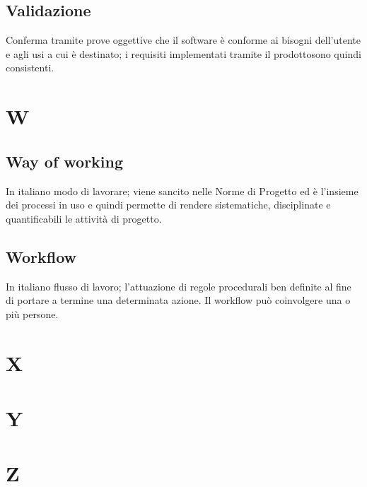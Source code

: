 \subsection*{Validazione}
Conferma tramite prove oggettive che il software è conforme ai bisogni dell'utente e agli usi a cui è destinato; i requisiti implementati tramite il prodotto\glosp sono quindi consistenti.

\clearpage
\section*{W}

\subsection*{Way of working}
In italiano modo di lavorare; viene sancito nelle Norme di Progetto ed è l'insieme dei processi in uso e quindi permette di rendere sistematiche, disciplinate e quantificabili le attività di progetto.

\subsection*{Workflow}
In italiano flusso di lavoro; l'attuazione di regole procedurali ben definite al fine di portare a termine una determinata azione. Il workflow può coinvolgere una o più persone.


\clearpage
\section*{X}

\clearpage
\section*{Y}

\clearpage
\section*{Z}
